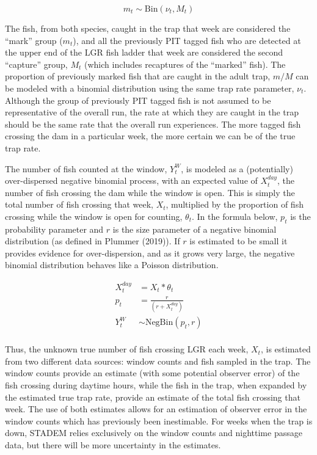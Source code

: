 \documentclass[
  12pt,
]{article}
\begin{document}
\begin{equation}
  m_t \sim \text{Bin} \left( \nu_t, M_t \right)
\end{equation}

The fish, from both species, caught in the trap that week are considered the ``mark'' group (\(m_t\)), and all the previously PIT tagged fish who are detected at the upper end of the LGR fish ladder that week are considered the second ``capture'' group, \(M_t\) (which includes recaptures of the ``marked'' fish). The proportion of previously marked fish that are caught in the adult trap, \(m/M\) can be modeled with a binomial distribution using the same trap rate parameter, \(\nu_t\). Although the group of previously PIT tagged fish is not assumed to be representative of the overall run, the rate at which they are caught in the trap should be the same rate that the overall run experiences. The more tagged fish crossing the dam in a particular week, the more certain we can be of the true trap rate.

The number of fish counted at the window, \(Y^W_t\), is modeled as a (potentially) over-dispersed negative binomial process, with an expected value of \(X_t^{day}\), the number of fish crossing the dam while the window is open. This is simply the total number of fish crossing that week, \(X_t\), multiplied by the proportion of fish crossing while the window is open for counting, \(\theta_t\). In the formula below, \(p_t\) is the probability parameter and \(r\) is the size parameter of a negative binomial distribution (as defined in Plummer (2019)). If \(r\) is estimated to be small it provides evidence for over-dispersion, and as it grows very large, the negative binomial distribution behaves like a Poisson distribution.

\begin{equation}
  \begin{aligned}
    X_t^{day} &= X_t * \theta_t \\
    p_t &= \frac{r}{\left( r + X_t^{day} \right)} \\  
    Y^W_t &\sim \text{NegBin} \left( p_t, r \right) \\
  \end{aligned}
\end{equation}

Thus, the unknown true number of fish crossing LGR each week, \(X_t\), is estimated from two different data sources: window counts and fish sampled in the trap. The window counts provide an estimate (with some potential observer error) of the fish crossing during daytime hours, while the fish in the trap, when expanded by the estimated true trap rate, provide an estimate of the total fish crossing that week. The use of both estimates allows for an estimation of observer error in the window counts which has previously been inestimable. For weeks when the trap is down, STADEM relies exclusively on the window counts and nighttime passage data, but there will be more uncertainty in the estimates.
\end{document}
